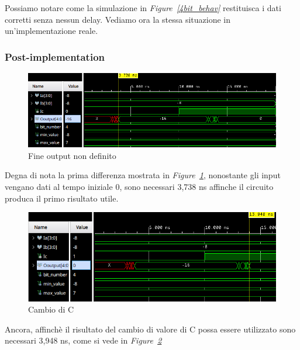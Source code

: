 Possiamo notare come la simulazione in \textit{Figure~\ref{4bit_behav}} restituisca i dati corretti senza nessun delay. Vediamo ora la stessa situazione in
un'implementazione reale.

\subsubsection{Post-implementation}
\begin{figure}[ht]
      \centering
      \includegraphics[width=1\textwidth]{assets/simulations/Post_Implementation/4bit/end_X.png}
      \caption{Fine output non definito}
      \label{4bit_pi_x}
\end{figure}

Degna di nota la prima differenza mostrata in \textit{Figure~\ref{4bit_pi_x}}, nonostante gli input vengano dati al tempo iniziale 0, sono necessari 3,738 ns affinche 
il circuito produca il primo risultato utile.

\begin{figure}[ht]
      \centering
      \includegraphics[width=1\textwidth]{assets/simulations/Post_Implementation/4bit/C_change.png}
      \caption{Cambio di C}
      \label{4bit_pi_c}
\end{figure}

Ancora, affinchè il risultato del cambio di valore di C possa essere utilizzato sono necessari 3,948 ns, come si vede in \textit{Figure~\ref{4bit_pi_c}}


